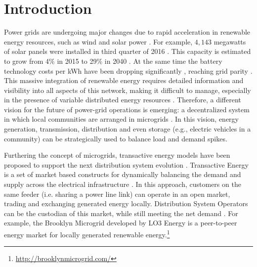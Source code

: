 \section{Introduction}



Power grids are undergoing major changes due to rapid
acceleration in renewable energy resources, such as wind and solar power \cite{EIA2014, 5430489}. For example, 
$4,143$ megawatts of solar panels were installed in third quarter of 2016 \cite{seia}. This capacity is estimated to grow from 4\% in 2015 to 29\% in 2040 \cite{Randal}. At the same time the battery technology costs per kWh have been dropping significantly \cite{stock2015powerful}, reaching grid parity \cite{bronski2015economics}. This massive integration of renewable energy requires detailed information and visibility into all aspects of this network, making it difficult to manage, especially in the presence of variable distributed energy resources \cite{7452738}. Therefore, a different vision for the future of power-grid operations is emerging: a decentralized system in which local communities are arranged in microgrids \cite{rahimi2012transactive}. In this vision, energy generation, transmission, distribution and even storage (e.g., electric vehicles in a community) can be strategically used to balance load and demand spikes. 


Furthering the concept of microgrids, transactive energy models have been proposed to support the next distribution system evolution \cite{kok2016society,cox2013structured,melton2013gridwise}. Transactive Energy is a set of market based constructs for dynamically balancing the demand and supply across the electrical infrastructure \cite{melton2013gridwise}. In this approach, customers on the same feeder (i.e. sharing a power line link) can operate in an open market, trading and exchanging generated energy locally. Distribution System Operators can be the custodian of this market, while still meeting the net demand \cite{7462854}. For example, the Brooklyn Microgrid developed by LO3 Energy is a peer-to-peer energy market for locally generated renewable energy.\footnote{\url{http://brooklynmicrogrid.com/}}

